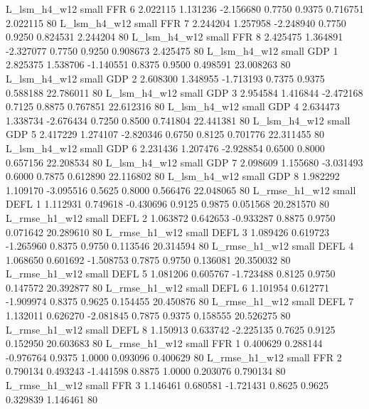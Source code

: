  L_lsm_h4_w12      small      FFR                 6 2.022115 1.131236 -2.156680 0.7750 0.9375  0.716751    2.022115 80
 L_lsm_h4_w12      small      FFR                 7 2.244204 1.257958 -2.248940 0.7750 0.9250  0.824531    2.244204 80
 L_lsm_h4_w12      small      FFR                 8 2.425475 1.364891 -2.327077 0.7750 0.9250  0.908673    2.425475 80
 L_lsm_h4_w12      small      GDP                 1 2.825375 1.538706 -1.140551 0.8375 0.9500  0.498591   23.008263 80
 L_lsm_h4_w12      small      GDP                 2 2.608300 1.348955 -1.713193 0.7375 0.9375  0.588188   22.786011 80
 L_lsm_h4_w12      small      GDP                 3 2.954584 1.416844 -2.472168 0.7125 0.8875  0.767851   22.612316 80
 L_lsm_h4_w12      small      GDP                 4 2.634473 1.338734 -2.676434 0.7250 0.8500  0.741804   22.441381 80
 L_lsm_h4_w12      small      GDP                 5 2.417229 1.274107 -2.820346 0.6750 0.8125  0.701776   22.311455 80
 L_lsm_h4_w12      small      GDP                 6 2.231436 1.207476 -2.928854 0.6500 0.8000  0.657156   22.208534 80
 L_lsm_h4_w12      small      GDP                 7 2.098609 1.155680 -3.031493 0.6000 0.7875  0.612890   22.116802 80
 L_lsm_h4_w12      small      GDP                 8 1.982292 1.109170 -3.095516 0.5625 0.8000  0.566476   22.048065 80
L_rmse_h1_w12      small     DEFL                 1 1.112931 0.749618 -0.430696 0.9125 0.9875  0.051568   20.281570 80
L_rmse_h1_w12      small     DEFL                 2 1.063872 0.642653 -0.933287 0.8875 0.9750  0.071642   20.289610 80
L_rmse_h1_w12      small     DEFL                 3 1.089426 0.619723 -1.265960 0.8375 0.9750  0.113546   20.314594 80
L_rmse_h1_w12      small     DEFL                 4 1.068650 0.601692 -1.508753 0.7875 0.9750  0.136081   20.350032 80
L_rmse_h1_w12      small     DEFL                 5 1.081206 0.605767 -1.723488 0.8125 0.9750  0.147572   20.392877 80
L_rmse_h1_w12      small     DEFL                 6 1.101954 0.612771 -1.909974 0.8375 0.9625  0.154455   20.450876 80
L_rmse_h1_w12      small     DEFL                 7 1.132011 0.626270 -2.081845 0.7875 0.9375  0.158555   20.526275 80
L_rmse_h1_w12      small     DEFL                 8 1.150913 0.633742 -2.225135 0.7625 0.9125  0.152950   20.603683 80
L_rmse_h1_w12      small      FFR                 1 0.400629 0.288144 -0.976764 0.9375 1.0000  0.093096    0.400629 80
L_rmse_h1_w12      small      FFR                 2 0.790134 0.493243 -1.441598 0.8875 1.0000  0.203076    0.790134 80
L_rmse_h1_w12      small      FFR                 3 1.146461 0.680581 -1.721431 0.8625 0.9625  0.329839    1.146461 80
